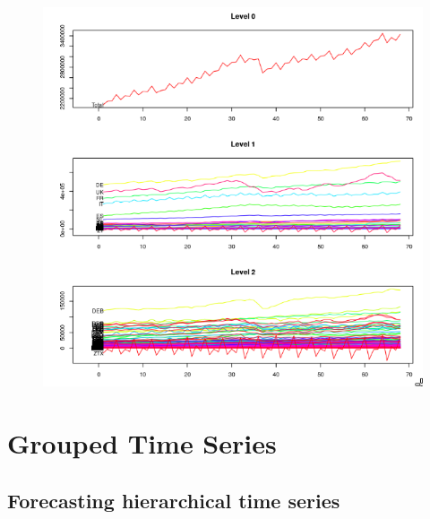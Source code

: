 \documentclass[c, dvipsnames]{beamer}  %
\begin{document}
\begin{frame}[shrink=5]
\frametitle{\insertsection} 
\framesubtitle{\insertsubsection}

\begin{figure}
	\centering
	\includegraphics[width=0.7\linewidth]{screenshot028}
	\label{fig:screenshot028}
\end{figure}



\end{frame}



\section{Grouped Time Series}



\subsection{Forecasting hierarchical  time series}
\end{document}
